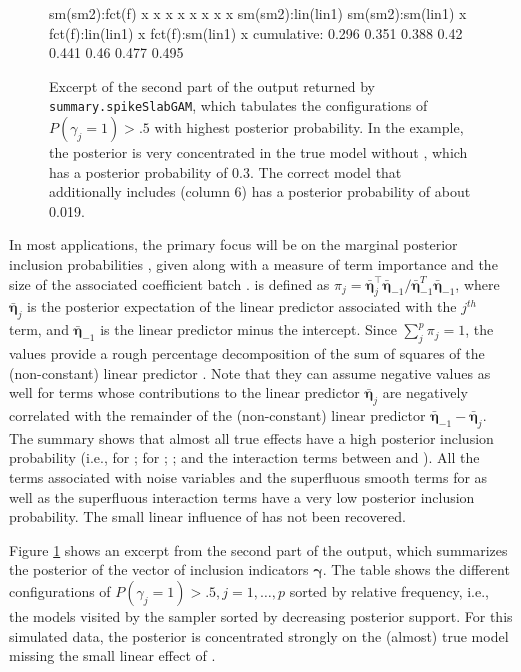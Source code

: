 \documentclass[article, shortnames, nojss, noheadings, notitle]{jss}
\begin{document}
\begin{figure}[!htbp]
\begin{small}
\begin{Schunk}
\begin{Soutput}
sm(sm2):fct(f)         x     x     x     x     x     x     x     x
sm(sm2):lin(lin1)                                                 
sm(sm2):sm(lin1)             x                                    
fct(f):lin(lin1)                               x                  
fct(f):sm(lin1)                    x                              
cumulative:        0.296 0.351 0.388  0.42 0.441  0.46 0.477 0.495
\end{Soutput}
\end{Schunk}
\end{small}
\caption{Excerpt of the second part of the output returned by \texttt{summary.spikeSlabGAM}, which tabulates the
configurations of $P(\gamma_j=1)>.5$ with highest posterior probability. In the example,
the posterior is very concentrated in the true model without , which has a posterior
probability of 0.3. The correct model
that additionally includes  (column 6)
has a posterior probability of about 0.019.}
\label{sum12}
\end{figure}
In most applications, the primary focus will be on the marginal posterior inclusion probabilities ,
given along with a measure of term importance  and the size of the associated coefficient batch .
 is defined as $\pi_j = \bm{\bar{\eta}}_j^\top\bm{\bar{\eta}}_{-1}/\bm{\bar{\eta}}_{-1}^T\bm{\bar{\eta}}_{-1}$,
where $\bm{\bar{\eta}}_j$ is the posterior expectation of the linear predictor associated with the $j^{th}$ term, and $\bm{\bar{\eta}}_{-1}$
is the linear predictor minus the intercept. Since $\sum^p_j\pi_j=1$,  the  values provide a rough percentage decomposition
of the sum of squares of the (non-constant) linear predictor \citep{Gu:1992}. Note that they can assume negative values as well for terms
whose contributions to the linear predictor $\bm{\bar{\eta}}_j$ are negatively correlated with the remainder of the (non-constant)
linear predictor $\bm{\bar{\eta}}_{-1} - \bm{\bar{\eta}}_j$.
The summary shows that almost all true effects have a high posterior inclusion probability (i.e.,  for ;
 for ; ; and the interaction terms between  and ).
All the terms associated with noise variables and the superfluous smooth terms for  as well as the
superfluous interaction terms have a very low posterior inclusion probability.  The small linear influence of 
has not been recovered.

Figure \ref{sum12} shows an excerpt from the second part of the  output, which summarizes
the posterior of the vector of inclusion indicators $\bm \gamma$.
The table shows the different configurations
of $P(\gamma_j =1)>.5, j=1,\ldots,p$ sorted by relative frequency, i.e., the models visited by the sampler sorted by decreasing posterior support. For this simulated data,
the posterior is concentrated strongly on the (almost) true model missing the small linear effect of .
\end{document}
